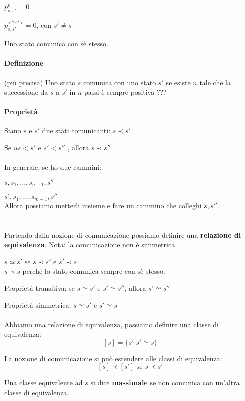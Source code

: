 \documentclass[a4paper,12pt]{book}
\begin{document}
$ p^{n}_{s,s'} = 0 $

$ p^{(???)}_{s,s'} = 0 $, con $ s' \ne s $ %

Uno stato comunica con sè stesso. 

\paragraph{Definizione} (più precisa) Uno stato $ s $ comunica con uno stato $ s' $ se esiste $ n $ tale che la successione da $ s $ a $ s' $ in $ n $ passi è sempre positiva ??? %

\paragraph{Proprietà} Siano $ s $ e $ s' $ due stati comunicanti: $ s \prec s' $

Se $ us < s' $ e $ s' < s'' $ %
, allora $ s \prec s'' $ \\
\\
In generale, se ho due cammini:

$ s, s_1, ..., s_{n-1}, s'' $

$ s', \bar{s}_1, ..., \bar{s}_{m-1}, s'' $
\\
Allora possiamo metterli insieme e fare un cammino che colleghi $ s, s''$. \\
\\
\\
Partendo dalla nozione di comunicazione possiamo definire una \textbf{relazione di equivalenza}. Nota: la comunicazione non è simmetrica. 

$ s \simeq s' $ se $ s \prec s' $ e $ s' \prec s $
\\
$ s \prec s $ perché lo stato comunica sempre con sè stesso.

Proprietà transitiva: se $ s \simeq s' $ e $ s' \simeq s'' $, allora $ s' \simeq s'' $

Proprietà simmetrica: $ s \simeq s' $ e $ s' \simeq s $
\\
\\
Abbiamo una relazione di equivalenza, possiamo definire una classe di equivalenza:
$$ [s] = \{s' | s' \simeq s\} $$

La nozione di comunicazione si può estendere alle classi di equivalenza:
$$ [s] \prec [s'] \text{ se } s \prec s'$$

Una classe equivalente ad $ s $ si dice \textbf{massimale} se non comunica con un'altra classe di equivalenza. 
\end{document}
